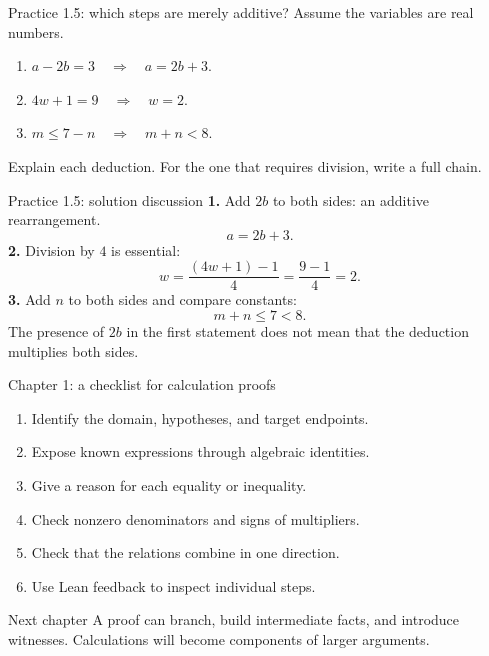\begin{frame}{Practice 1.5: which steps are merely additive?}
Assume the variables are real numbers.
\begin{enumerate}
\item $a-2b=3\quad\Longrightarrow\quad a=2b+3$.
\item $4w+1=9\quad\Longrightarrow\quad w=2$.
\item $m\le7-n\quad\Longrightarrow\quad m+n<8$.
\end{enumerate}
\vspace{1em}
Explain each deduction. For the one that requires division, write a full chain.
\end{frame}

\begin{frame}{Practice 1.5: solution discussion}
\textbf{1.} Add $2b$ to both sides: an additive rearrangement.
\[
a=2b+3.
\]
\textbf{2.} Division by $4$ is essential:
\[
w=\frac{(4w+1)-1}{4}=\frac{9-1}{4}=2.
\]
\textbf{3.} Add $n$ to both sides and compare constants:
\[
m+n\le7<8.
\]
The presence of $2b$ in the first statement does not mean that the deduction multiplies both sides.
\end{frame}

\begin{frame}{Chapter 1: a checklist for calculation proofs}
\begin{enumerate}
\item Identify the domain, hypotheses, and target endpoints.
\item Expose known expressions through algebraic identities.
\item Give a reason for each equality or inequality.
\item Check nonzero denominators and signs of multipliers.
\item Check that the relations combine in one direction.
\item Use Lean feedback to inspect individual steps.
\end{enumerate}
\begin{block}{Next chapter}
A proof can branch, build intermediate facts, and introduce witnesses.
Calculations will become components of larger arguments.
\end{block}
\end{frame}

